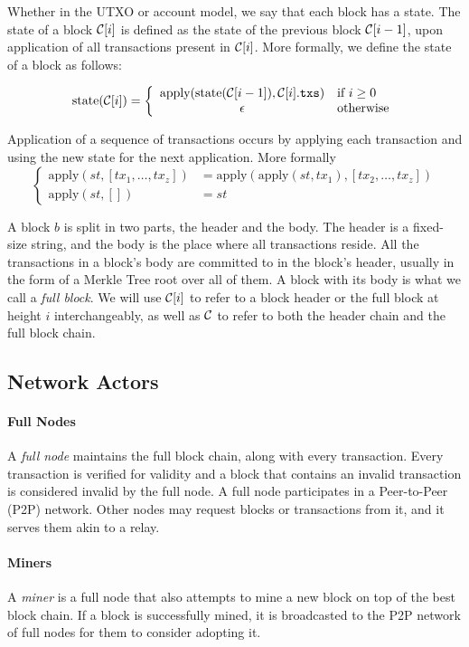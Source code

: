 Whether in the UTXO or account model, we say that each block has a state. The state of a block $\mathcal{C}[i]$ is defined as the state of the previous block $\mathcal{C}[i-1]$, upon application of all transactions present in $\mathcal{C}[i]$. More formally, we define the state of a block as follows:

\[
\text{state}(\mathcal{C}[i]) = \left\{
    \begin{array}{cl}
        \text{apply}(\text{state}(\mathcal{C}[i-1]), \mathcal{C}[i].\texttt{txs}) & \text{if } i \ge 0 \\
        \epsilon & \text{otherwise}
    \end{array}
\right.
\]

Application of a sequence of transactions occurs by applying each transaction and using the new state for the next application. More formally
\[
\left\{
    \begin{array}{rl}
        \text{apply}(st, [tx_1, \dots, tx_z]) &= \text{apply}(\text{apply}(st, tx_1), [tx_2, \dots, tx_z]) \\
        \text{apply}(st, []) &= st
    \end{array}
\right.
\]

A block $b$ is split in two parts, the header and the body. The header is a fixed-size string, and the body is the place where all transactions reside. All the transactions in a block's body are committed to in the block's header, usually in the form of a Merkle Tree root over all of them. A block with its body is what we call a \emph{full block}. We will use $\mathcal{C}[i]$ to refer to a block header or the full block at height $i$ interchangeably, as well as $\mathcal{C}$ to refer to both the header chain and the full block chain.

\subsection{Network Actors}
\paragraph{Full Nodes}
A \emph{full node} maintains the full block chain, along with every transaction. Every transaction is verified for validity and a block that contains an invalid transaction is considered invalid by the full node. A full node participates in a Peer-to-Peer (P2P) network. Other nodes may request blocks or transactions from it, and it serves them akin to a relay.
\paragraph{Miners}
A \emph{miner} is a full node that also attempts to mine a new block on top of the best block chain. If a block is successfully mined, it is broadcasted to the P2P network of full nodes for them to consider adopting it.

